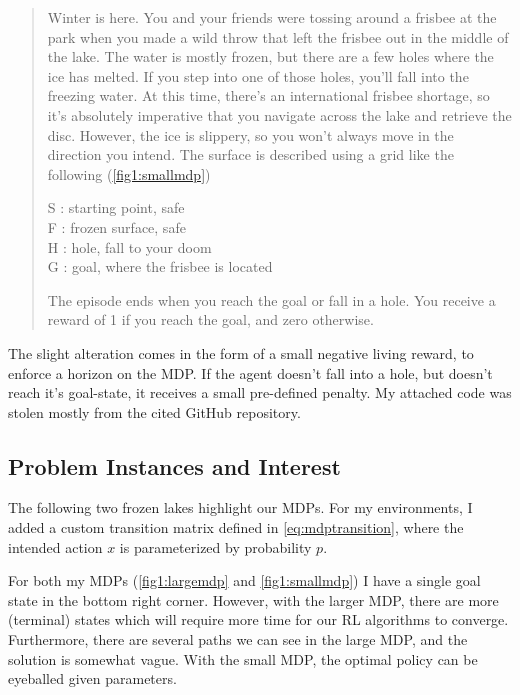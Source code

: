 \documentclass[letter]{article}
\begin{document}
\begin{quote}
    Winter is here. You and your friends were tossing around a frisbee at the park
    when you made a wild throw that left the frisbee out in the middle of the lake.
    The water is mostly frozen, but there are a few holes where the ice has melted.
    If you step into one of those holes, you'll fall into the freezing water.
    At this time, there's an international frisbee shortage, so it's absolutely imperative that
    you navigate across the lake and retrieve the disc.
    However, the ice is slippery, so you won't always move in the direction you intend.
    The surface is described using a grid like the following (\ref{fig1:smallmdp})

    S : starting point, safe\\
    F : frozen surface, safe\\
    H : hole, fall to your doom\\
    G : goal, where the frisbee is located

    The episode ends when you reach the goal or fall in a hole.
    You receive a reward of 1 if you reach the goal, and zero otherwise.
\end{quote}
The slight alteration comes in the form of a small negative living reward, to enforce a horizon on the MDP. If the agent doesn't fall into a hole, but doesn't reach it's goal-state, it receives a small pre-defined penalty. My attached code was stolen mostly from the cited GitHub repository.

\subsection{Problem Instances and Interest}
The following two frozen lakes highlight our MDPs. For my environments, I added a custom transition matrix defined in \ref{eq:mdptransition}, where the intended action $x$ is parameterized by probability $p$.

For both my MDPs (\ref{fig1:largemdp} and \ref{fig1:smallmdp}) I have a single goal state in the bottom right corner. However, with the larger MDP, there are more (terminal) states which will require more time for our RL algorithms to converge. Furthermore, there are several paths we can see in the large MDP, and the solution is somewhat vague. With the small MDP, the optimal policy can be eyeballed given parameters. 
\end{document}
